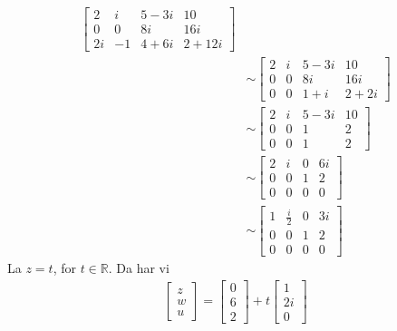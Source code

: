 \documentclass[11pt, a4paper, norsk]{NTNUoving}
\begin{document}
\begin{oppgave}
\begin{punkt}
\begin{align*}
\begin{bmatrix}
            2 & i & 5-3i & 10\\
            0 & 0 & 8i & 16i\\
            2i & -1 & 4+6i & 2 + 12i
        \end{bmatrix}
           \\&\sim
        \begin{bmatrix} %
            2 & i & 5-3i & 10\\
            0 & 0 & 8i & 16i\\
            0 & 0 & 1+i & 2 + 2i
        \end{bmatrix}
           \\&\sim
        \begin{bmatrix} %
            2 & i & 5-3i & 10\\
            0 & 0 & 1 & 2\\
            0 & 0 & 1 & 2
        \end{bmatrix}
           \\&\sim
        \begin{bmatrix} %
            2 & i & 0 & 6i\\
            0 & 0 & 1 & 2\\
            0 & 0 & 0 & 0
        \end{bmatrix}
           \\&\sim
        \begin{bmatrix} %
            1 & \frac{i}{2} & 0 & 3i\\
            0 & 0 & 1 & 2\\
            0 & 0 & 0 & 0
        \end{bmatrix}
        \end{align*}
        La $z=t$, for $t \in \mathbb{R}$. Da har vi
        \begin{align*}
        \begin{bmatrix} %
            z\\
            w\\
            u
        \end{bmatrix}
        =
        \begin{bmatrix} %
            0\\
            6\\
            2
        \end{bmatrix}
        +t
        \begin{bmatrix} %
            1\\
            2i\\
            0
        \end{bmatrix}
        \end{align*}
    \end{punkt}
\end{oppgave}
\end{document}
